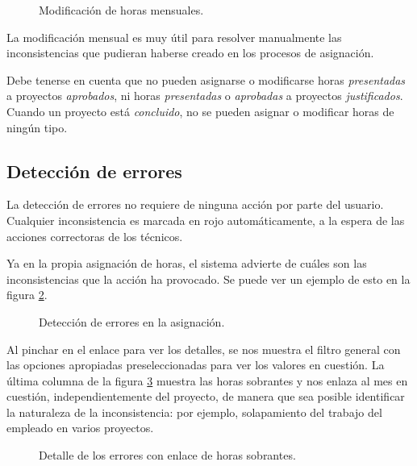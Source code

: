 \begin{figure}
\centering
{}
\caption{Modificación de horas mensuales.}
\label{fig:mod_horas_mes}
\end{figure}

La modificación mensual es muy útil para resolver manualmente las
inconsistencias que pudieran haberse creado en los procesos de asignación.

Debe tenerse en cuenta que no pueden asignarse o modificarse horas
\textit{presentadas} a proyectos \textit{aprobados}, ni horas
\textit{presentadas} o \textit{aprobadas} a proyectos \textit{justificados}.
Cuando un proyecto está \textit{concluido}, no se pueden asignar o modificar
horas de ningún tipo.

\subsection{Detección de errores}

La detección de errores no requiere de ninguna acción por parte del usuario.
Cualquier inconsistencia es marcada en rojo automáticamente, a la espera de las
acciones correctoras de los técnicos.

Ya en la propia asignación de horas, el sistema advierte de cuáles son las
inconsistencias que la acción ha provocado. Se puede ver un ejemplo de esto en
la figura \ref{fig:errores_detectados}.

\begin{figure}
\centering
{}
\caption{Detección de errores en la asignación.}
\label{fig:errores_detectados}
\end{figure}

Al pinchar en el enlace para ver los detalles, se nos muestra el filtro general
con las opciones apropiadas preseleccionadas para ver los valores en cuestión.
La última columna de la figura \ref{fig:detalles_errores} muestra las horas
sobrantes y nos enlaza al mes en cuestión, independientemente del proyecto, de
manera que sea posible identificar la naturaleza de la inconsistencia: por
ejemplo, solapamiento del trabajo del empleado en varios proyectos.

\begin{figure}
\centering
{}
\caption{Detalle de los errores con enlace de horas sobrantes.}
\label{fig:detalles_errores}
\end{figure}

